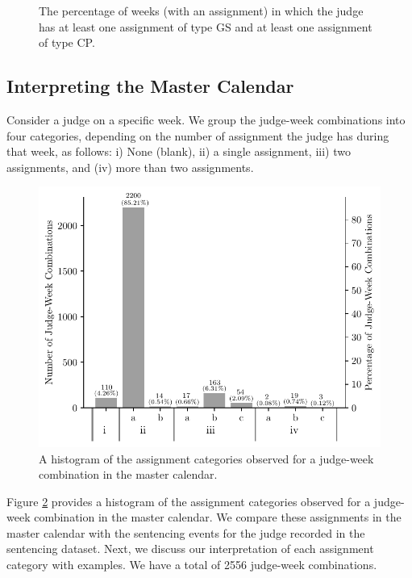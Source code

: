 \documentclass[11pt, oneside]{article}   	%
\theoremstyle{ModifiedStyle}
\begin{document}
\begin{figure}[H]
\begin{minipage}{\textwidth}
		\vspace{-3mm}
		\caption{The percentage of weeks (with an assignment) in which the judge has at least one assignment of type GS and at least one assignment of type CP.}
		\label{Figure_Judge_Schedule_GS_CP_Percentage_Histogram}
	\end{minipage}
\end{figure}

\subsection{Interpreting the Master Calendar}
\label{Sec:Master_Calendar:Interpreting_Master_Calendar}

Consider a judge on a specific week. We group the judge-week combinations into four categories, depending on the number of assignment the judge has during that week, as follows: i) None (blank), ii) a single assignment, iii) two assignments, and (iv) more than two assignments.

\begin{figure}[h!]
	\centering
	\includegraphics[scale=0.75]{Figures/Simultaneous_Assignment_Count_Histogram}
	\caption{A histogram of the assignment categories observed for a judge-week combination in the master calendar.}
	\label{Figure_Simultaneous_Assignment_Count_Histogram}
\end{figure}
	
Figure \ref{Figure_Simultaneous_Assignment_Count_Histogram} provides a histogram of the assignment categories observed for a judge-week combination in the master calendar. We compare these assignments in the master calendar with the sentencing events for the judge recorded in the sentencing dataset. Next, we discuss our interpretation  of each assignment category with examples. We have a total of 2556 judge-week combinations.
\end{document}
